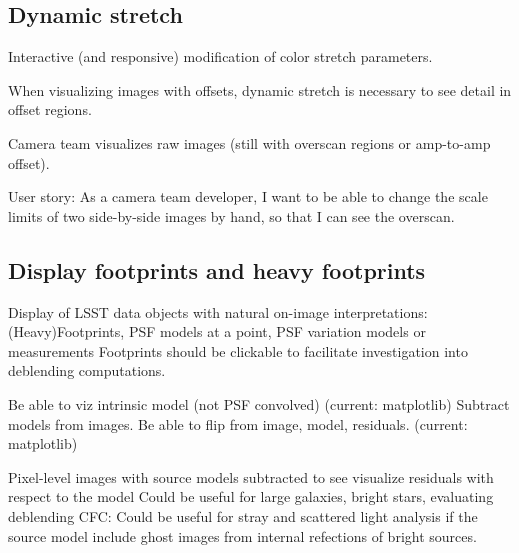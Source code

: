 \subsection{Dynamic stretch}

Interactive (and responsive) modification of color stretch parameters.

When visualizing images with offsets, dynamic stretch is necessary to see detail in offset regions.

Camera team visualizes raw images (still with overscan regions or amp-to-amp offset).

User story: As a camera team developer,  I want to be able to change the scale limits of two side-by-side images by hand, so that I can see the overscan.



\subsection{Display footprints and heavy footprints}
Display of LSST data objects with natural on-image interpretations: (Heavy)Footprints, PSF models at a point, PSF variation models or measurements
Footprints should be clickable to facilitate investigation into deblending computations.

Be able to viz intrinsic model (not PSF convolved) (current: matplotlib)
Subtract models from images. Be able to flip from image, model, residuals.   (current: matplotlib)

Pixel-level images with source models subtracted to see visualize residuals with respect to the model
Could be useful for large galaxies, bright stars, evaluating deblending
CFC: Could be useful for stray and scattered light analysis if the source model include ghost images from internal refections of bright sources.

